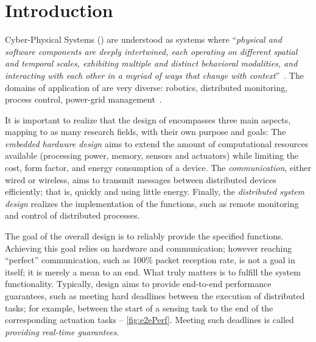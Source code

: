 
\chapter{Introduction}
\label{ch:introduction}



Cyber-Physical Systems (\CPS) are understood as systems where ``\emph{physical and software components are deeply intertwined, each operating on different spatial and temporal scales, exhibiting multiple and distinct behavioral modalities, and interacting with each other in a myriad of ways that change with context}''~\cite{nsf2010Cyber}.
The domains of application of \CPS are very diverse: \eg robotics, distributed monitoring, process control, power-grid management~\cite{stankovic2008WSAN, lee2008Cyber, rajkumar2010CPS}.

It is important to realize that the design of \CPS encompasses three main aspects, mapping to as many research fields, with their own purpose and goals: %
	The \emph{embedded hardware design} aims to extend the amount of computational resources available (\eg processing power, memory, sensors and actuators) while limiting the cost, form factor, and energy consumption of a device.
	The \emph{communication}, either wired or wireless, aims to transmit messages between distributed devices efficiently; that is, quickly and using little energy.
	Finally, the \emph{distributed system design} realizes the implementation of the \CPS functions, such as \eg remote monitoring and control of distributed processes.

The goal of the overall design is to reliably provide the specified \CPS functions.
Achieving this goal relies on hardware and communication; however reaching ``perfect'' communication, such as 100\% packet reception rate, is not a goal in itself; it is merely a mean to an end. What truly matters is to fulfill the system functionality.
Typically, \CPS design aims to provide end-to-end performance guarantees, such as meeting hard deadlines between the execution of distributed tasks; for example, between the start of a sensing task to the end of the corresponding actuation tasks -- \cref{fig:e2ePerf}.
Meeting such deadlines is called \emph{providing real-time guarantees}.

